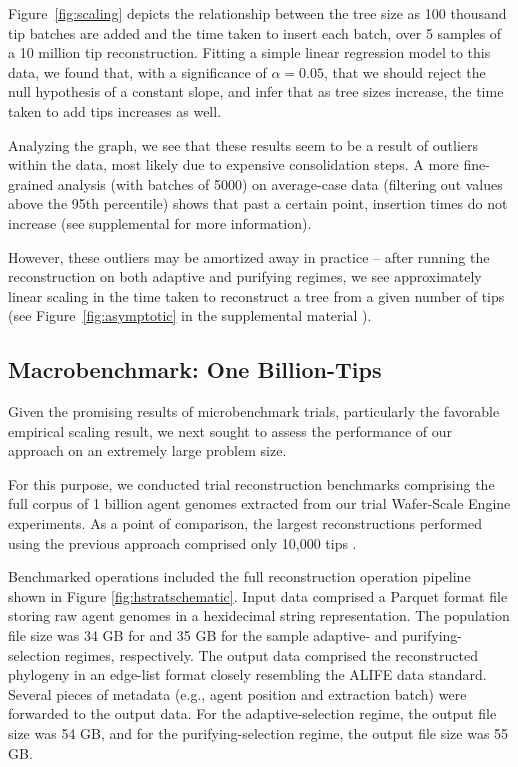 Figure~\ref{fig:scaling} depicts the relationship between the tree size as 100 thousand tip batches are added and the time taken to insert each batch, over 5 samples of a 10 million tip reconstruction.
Fitting a simple linear regression model to this data, we found that, with a significance of $\alpha = 0.05$, that we should reject the null hypothesis of a constant slope, and infer that as tree sizes increase, the time taken to add tips increases as well.

Analyzing the graph, we see that these results seem to be a result of outliers within the data, most likely due to expensive consolidation steps. A more fine-grained analysis (with batches of 5000) on average-case data (filtering out values above the 95th percentile) shows that past a certain point, insertion times do not increase (see supplemental \citep{supplemental} for more information).

However, these outliers may be amortized away in practice -- after running the reconstruction on both adaptive and purifying regimes, we see approximately linear scaling in the time taken to reconstruct a tree from a given number of tips (see Figure~\ref{fig:asymptotic} in the supplemental material \citep{supplemental}).

\subsection{Macrobenchmark: One Billion-Tips}



Given the promising results of microbenchmark trials, particularly the favorable empirical scaling result, we next sought to assess the performance of our approach on an extremely large problem size.

For this purpose, we conducted trial reconstruction benchmarks comprising the full corpus of 1 billion agent genomes extracted from our trial Wafer-Scale Engine experiments.
As a point of comparison, the largest reconstructions performed using the previous approach comprised only 10,000 tips \citep{moreno2024trackable}.

Benchmarked operations included the full reconstruction operation pipeline shown in Figure \ref{fig:hstratschematic}.
Input data comprised a Parquet format file storing raw agent genomes in a hexidecimal string representation.
The population file size was 34 GB for and 35 GB for the sample adaptive- and purifying-selection regimes, respectively.
The output data comprised the reconstructed phylogeny in an edge-list format closely resembling the ALIFE data standard.
Several pieces of metadata (e.g., agent position and extraction batch) were forwarded to the output data.
For the adaptive-selection regime, the output file size was 54 GB, and for the purifying-selection regime, the output file size was 55 GB.

